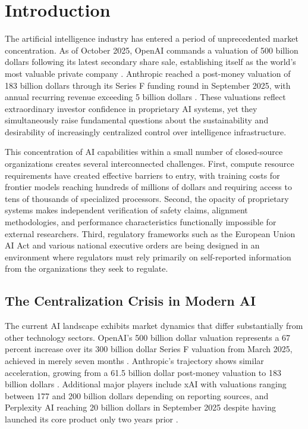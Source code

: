 
\section{Introduction}

The artificial intelligence industry has entered a period of unprecedented market concentration. As of October 2025, OpenAI commands a valuation of 500 billion dollars following its latest secondary share sale, establishing itself as the world's most valuable private company \cite{openai2025}. Anthropic reached a post-money valuation of 183 billion dollars through its Series F funding round in September 2025, with annual recurring revenue exceeding 5 billion dollars \cite{anthropic2025}. These valuations reflect extraordinary investor confidence in proprietary AI systems, yet they simultaneously raise fundamental questions about the sustainability and desirability of increasingly centralized control over intelligence infrastructure.

This concentration of AI capabilities within a small number of closed-source organizations creates several interconnected challenges. First, compute resource requirements have created effective barriers to entry, with training costs for frontier models reaching hundreds of millions of dollars and requiring access to tens of thousands of specialized processors. Second, the opacity of proprietary systems makes independent verification of safety claims, alignment methodologies, and performance characteristics functionally impossible for external researchers. Third, regulatory frameworks such as the European Union AI Act and various national executive orders are being designed in an environment where regulators must rely primarily on self-reported information from the organizations they seek to regulate.

\subsection{The Centralization Crisis in Modern AI}

The current AI landscape exhibits market dynamics that differ substantially from other technology sectors. OpenAI's 500 billion dollar valuation represents a 67 percent increase over its 300 billion dollar Series F valuation from March 2025, achieved in merely seven months \cite{openai2025}. Anthropic's trajectory shows similar acceleration, growing from a 61.5 billion dollar post-money valuation to 183 billion dollars \cite{anthropic2025}. Additional major players include xAI with valuations ranging between 177 and 200 billion dollars depending on reporting sources, and Perplexity AI reaching 20 billion dollars in September 2025 despite having launched its core product only two years prior \cite{perplexity2025}.

